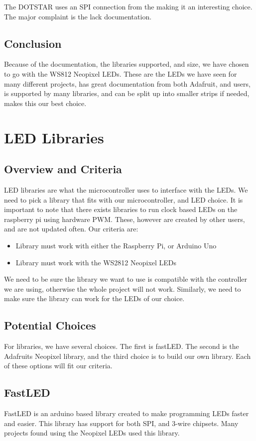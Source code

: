 	\vspace{5mm}
	\noindent The DOTSTAR uses an SPI connection from the making it an interesting choice.
	The major complaint is the lack documentation.
	\subsection{Conclusion}
	\noindent Because of the documentation, the libraries supported, and size,
	we have chosen to go with the WS812 Neopixel LEDs. These are the LEDs we
	have seen for many different projects, has great documentation from both
	Adafruit, and users, is supported by many libraries, and can be split up
	into smaller strips if needed, makes this our best choice.


\section{LED Libraries}
	\subsection{Overview and Criteria}
	\noindent LED libraries are what the microcontroller uses to interface with
	the LEDs. We need to pick a library that fits with our microcontroller, and
	LED choice. It is important to note that there exists libraries to run
	clock based LEDs on the raspberry pi using hardware PWM. These, however
	are created by other users, and are not updated often. Our
	criteria are:
	\begin{itemize}
		\item Library must work with either the Raspberry Pi, or Arduino Uno
		\item Library must work with the WS2812 Neopixel LEDs
	\end{itemize}
	\noindent We need to be sure the library we want to use is compatible with
	the controller we are using, otherwise the whole project will not work.
	Similarly, we need to make sure the library can work for the LEDs of our
	choice.
	\subsection{Potential Choices}
	\noindent For libraries, we have several choices. The first is fastLED. The
	second is the Adafruits Neopixel library, and the third choice is to build
	our own library. Each of these options will fit our criteria.
	\subsection{FastLED}
	\noindent FastLED is an arduino based library created to make programming
	LEDs faster and easier. This library has support for both SPI, and 3-wire
	chipsets\cite[Pg 7]{fastLED}. Many projects found using the Neopixel LEDs
	used this library.

